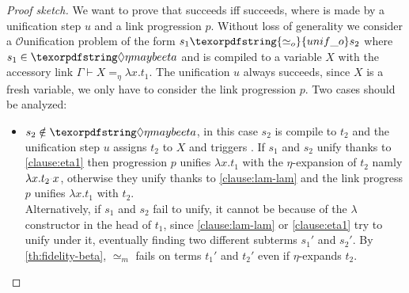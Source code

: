 \documentclass[sigconf,natbib=false,review]{acmart}
\newcommand{\appsep}{\ensuremath{\textcolor{lightgray}{\cdot}}}
\newcommand{\UnifRel}{\ensuremath{\simeq}}
\newcommand{\Uo}{\texorpdfstring{\ensuremath{\UnifRel_o}\xspace}{unif\_o}}
\newcommand{\Ue}{\ensuremath{\UnifRel_m}\xspace}
\newcommand{\Fo}{\texorpdfstring{\ensuremath{\mathcal{O}\xspace}}{O}} %
\newcommand{\linketaM}[3]{\ensuremath{#1 \vdash #2 =_\eta #3}}
\newcommand{\linkStore}{\texorpdfstring{\ensuremath{\mathbb{L}}\xspace}{L}}
\newcommand{\hoUnifPb}{\ensuremath{\mathbb{Q}}\xspace}
\begin{document}
\begin{proof}[Proof sketch] %
  We want to prove that \fstep succeeds iff \hstep
  succeeds, where \hstep is made by a unification step $u$ and a link
  progression $p$.
  Without loss of generality we consider a
  \Fo unification problem of the form $s_1 \Uo s_2$
  where $s_1 \in \maybeeta$ and is compiled to a variable $X$ with the accessory link
  $\linketaM{\Gamma}{X}{\lambda x.t_1}$. 
  The unification $u$ always succeeds, since $X$ is a fresh variable, we 
  only have to consider the link progression $p$.
  Two cases should be analyzed:
  \begin{itemize}
    \item $s_2 \notin \maybeeta$,
          in this case $s_2$ is compile to $t_2$ and the unification step $u$ assigns $t_2$ to $X$
          and triggers \progressetaleft.
          If $s_1$ and $s_2$ unify thanks to \ref{clause:eta1} then
          progression $p$ unifies $\lambda x.t_1$ with the $\eta$-expansion of $t_2$ namly
          $\lambda x.t_2\appsep x$, otherwise they unify thanks to \ref{clause:lam-lam}
          and the link progress $p$ unifies $\lambda x.t_1$ with $t_2$.\\ Alternatively, if $s_1$ and $s_2$ fail
          to unify, it cannot be because of the $\lambda$ constructor in the head of $t_1$,
          since \ref{clause:lam-lam} or \ref{clause:eta1} try to unify under it, eventually finding two
          different subterms $s_1'$ and $s_2'$. By \cref{th:fidelity-beta},
          \Ue fails on terms $t_1'$ and $t_2'$ even if \progressetaleft
          $\eta$-expands $t_2$.



\end{itemize}
\end{proof}
\end{document}
